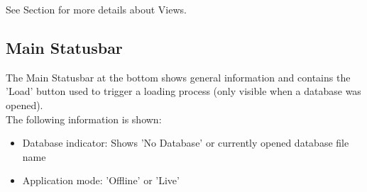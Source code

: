 See Section  for more details about Views.

\subsection{Main Statusbar}
\label{sec:ui_main_status_bar}

The Main Statusbar at the bottom shows general information and contains the 'Load' button used to trigger a loading process (only visible when a database was opened). \\

The following information is shown:

\begin{itemize}
 \item Database indicator: Shows 'No Database' or currently opened database file name
 \item Application mode: 'Offline' or 'Live'
\end{itemize}
\  \\
